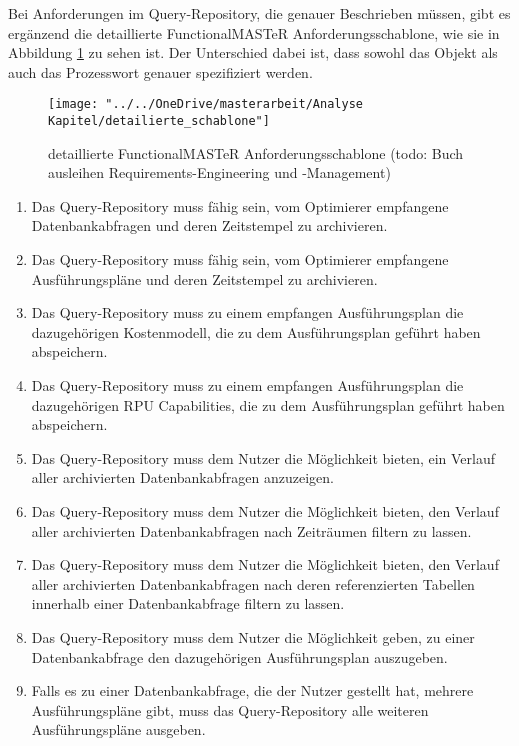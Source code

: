 Bei Anforderungen im Query-Repository, die genauer Beschrieben müssen, gibt es ergänzend die detaillierte FunctionalMASTeR Anforderungsschablone, wie sie in Abbildung \ref{fig:detailierteschablone} zu sehen ist. Der Unterschied dabei ist, dass sowohl das Objekt als auch das Prozesswort genauer spezifiziert werden.
\begin{figure}[h!]
	\centering
	\texttt{[image: "../../OneDrive/masterarbeit/Analyse Kapitel/detailierte\_schablone"]}
	\caption{ detaillierte FunctionalMASTeR Anforderungsschablone (todo: Buch ausleihen Requirements-Engineering und -Management) }
	\label{fig:detailierteschablone}
\end{figure}



\begin{enumerate}
\item  Das Query-Repository muss fähig sein, vom Optimierer empfangene Datenbankabfragen und deren Zeitstempel zu archivieren.
\label{1}
\item  Das Query-Repository muss fähig sein, vom Optimierer empfangene Ausführungspläne und deren Zeitstempel zu archivieren.
\label{2}
\item  Das Query-Repository muss zu einem empfangen Ausführungsplan die dazugehörigen Kostenmodell, die zu dem Ausführungsplan geführt haben abspeichern.
\label{111}
\item  Das Query-Repository muss zu einem empfangen Ausführungsplan die dazugehörigen RPU Capabilities, die zu dem Ausführungsplan geführt haben abspeichern.
\label{112}
\item  Das Query-Repository muss dem Nutzer die Möglichkeit bieten, ein Verlauf aller archivierten Datenbankabfragen anzuzeigen.
\label{3}
\item  Das Query-Repository muss dem Nutzer die Möglichkeit bieten, den Verlauf aller archivierten Datenbankabfragen nach Zeiträumen filtern zu lassen. 
\label{4}
\item  Das Query-Repository muss dem Nutzer die Möglichkeit bieten, den Verlauf aller archivierten Datenbankabfragen nach deren referenzierten Tabellen innerhalb einer Datenbankabfrage filtern zu lassen.
\label{5}
\item  Das Query-Repository muss dem Nutzer die Möglichkeit geben, zu einer Datenbankabfrage den dazugehörigen Ausführungsplan auszugeben. 
\label{9}
\item  Falls es zu einer Datenbankabfrage, die der Nutzer gestellt hat, mehrere Ausführungspläne gibt, muss das Query-Repository alle weiteren Ausführungspläne ausgeben.\label{90}




\end{enumerate}
